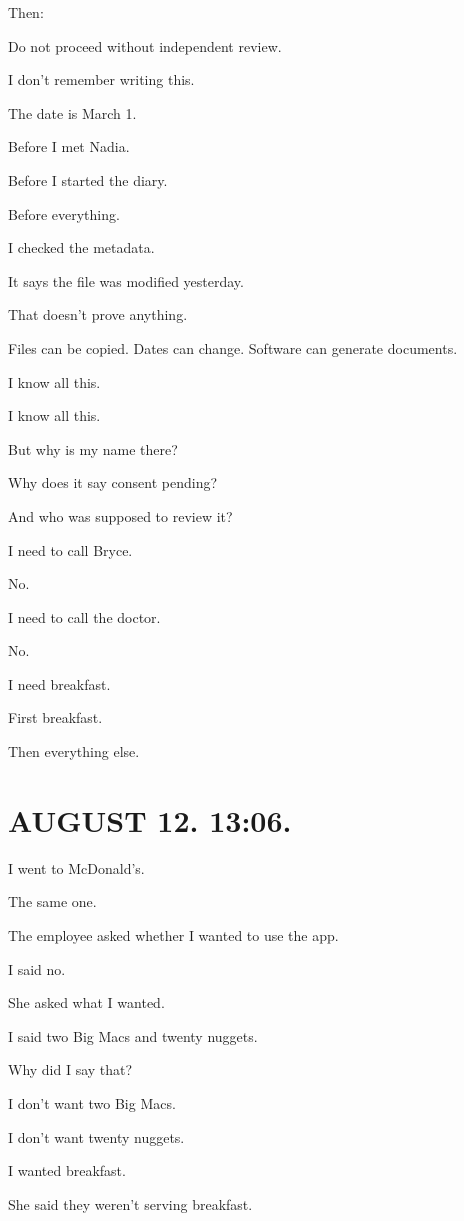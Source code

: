 \documentclass[11pt,oneside]{book}
\begin{document}
Then:

Do not proceed without independent review.

I don't remember writing this.

The date is March 1.

Before I met Nadia.

Before I started the diary.

Before everything.

I checked the metadata.

It says the file was modified yesterday.

That doesn't prove anything.

Files can be copied. Dates can change. Software can generate documents.

I know all this.

I know all this.

But why is my name there?

Why does it say consent pending?

And who was supposed to review it?

I need to call Bryce.

No.

I need to call the doctor.

No.

I need breakfast.

First breakfast.

Then everything else.

\section*{AUGUST 12. 13:06.}

I went to McDonald's.

The same one.

The employee asked whether I wanted to use the app.

I said no.

She asked what I wanted.

I said two Big Macs and twenty nuggets.

Why did I say that?

I don't want two Big Macs.

I don't want twenty nuggets.

I wanted breakfast.

She said they weren't serving breakfast.
\end{document}
